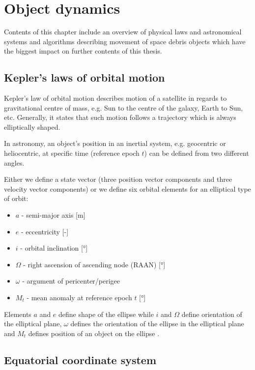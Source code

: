 \chapter{Object dynamics}\label{chap:object_dynamics}

	Contents of this chapter include an overview of physical laws and astronomical systems and algorithms describing movement of space debris objects which have the biggest impact on further contents of this thesis.

\section{Kepler's laws of orbital motion}\label{sec:kepler}
	
	Kepler's law of orbital motion describes motion of a satellite in regards to gravitational centre of mass, e.g. Sun to the centre of the galaxy, Earth to Sun, etc. Generally, it states that such motion follows a trajectory which is always elliptically shaped.
	
	In astronomy, an object's position in an inertial system, e.g. geocentric or heliocentric, at specific time (reference epoch $t$) can be defined from two different angles.
	
	Either we define a state vector (three position vector components and three velocity vector components) or we define six orbital elements for an elliptical type of orbit:
	
	\begin{itemize}
		\item $a$ - semi-major axis [m]
		\item $e$ - eccentricity [-]
		\item $i$ - orbital inclination [°]
		\item $\Omega$ - right ascension of ascending node (RAAN) [°]
		\item $\omega$ - argument of pericenter/perigee
		\item $M_t$ - mean anomaly at reference epoch $t$ [°]
	\end{itemize}
	
	Elements $a$ and $e$ define shape of the ellipse while $i$ and $\Omega$ define orientation of the elliptical plane, $\omega$ defines the orientation of the ellipse in the elliptical plane and $M_t$ defines position of an object on the ellipse \citep{montenbruck2005satellite}.

\section{Equatorial coordinate system}\label{sec:ra_dec}
	
